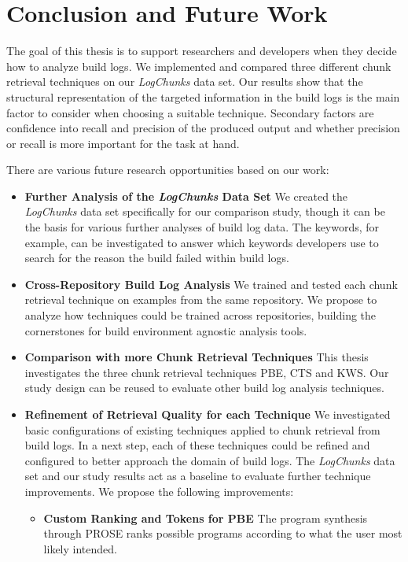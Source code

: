 \documentclass[\myrootdir/main.tex]{subfiles}
\begin{document}
\chapter{Conclusion and Future Work}
\label{sec:conclusion-fw}
The goal of this thesis is to support researchers and developers when they decide how to analyze build logs.
We implemented and compared three different chunk retrieval techniques on our \emph{LogChunks} data set.
Our results show that the structural representation of the targeted information in the build logs is the main factor to consider when choosing a suitable technique.
Secondary factors are confidence into recall and precision of the produced output and whether precision or recall is more important for the task at hand.

There are various future research opportunities based on our work:
\begin{itemize}
  \item \textbf{Further Analysis of the \emph{LogChunks} Data Set} We created the \emph{LogChunks} data set specifically for our comparison study, though it can be the basis for various further analyses of build log data.
  The keywords, for example, can be investigated to answer which keywords developers use to search for the reason the build failed within build logs.
  \item \textbf{Cross-Repository Build Log Analysis} We trained and tested each chunk retrieval technique on examples from the same repository.
  We propose to analyze how techniques could be trained across repositories, building the cornerstones for build environment agnostic analysis tools.
  \item \textbf{Comparison with more Chunk Retrieval Techniques} This thesis investigates the three chunk retrieval techniques PBE, CTS and KWS\@.
  Our study design can be reused to evaluate other build log analysis techniques.
  \item \textbf{Refinement of Retrieval Quality for each Technique} We investigated basic configurations of existing techniques applied to chunk retrieval from build logs.
  In a next step, each of these techniques could be refined and configured to better approach the domain of build logs.
  The \emph{LogChunks} data set and our study results act as a baseline to evaluate further technique improvements.
  We propose the following improvements:
    \begin{itemize}
      \item \textbf{Custom Ranking and Tokens for PBE} The program synthesis through PROSE ranks possible programs according to what the user most likely intended.

\end{itemize}
\end{itemize}
\end{document}
